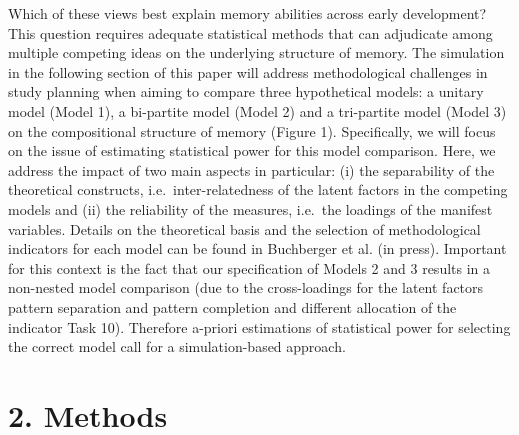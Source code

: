 \documentclass[
  man,floatsintext]{apa6}
\begin{document}
Which of these views best explain memory abilities across early development? This question requires adequate statistical methods that can adjudicate among multiple competing ideas on the underlying structure of memory. The simulation in the following section of this paper will address methodological challenges in study planning when aiming to compare three hypothetical models: a unitary model (Model 1), a bi-partite model (Model 2) and a tri-partite model (Model 3) on the compositional structure of memory (Figure 1). Specifically, we will focus on the issue of estimating statistical power for this model comparison. Here, we address the impact of two main aspects in particular: (i) the separability of the theoretical constructs, i.e.~inter-relatedness of the latent factors in the competing models and (ii) the reliability of the measures, i.e.~the loadings of the manifest variables. Details on the theoretical basis and the selection of methodological indicators for each model can be found in Buchberger et al. (in press). Important for this context is the fact that our specification of Models 2 and 3 results in a non-nested model comparison (due to the cross-loadings for the latent factors pattern separation and pattern completion and different allocation of the indicator Task 10). Therefore a-priori estimations of statistical power for selecting the correct model call for a simulation-based approach.

\hypertarget{methods}{%
\section{2. Methods}\label{methods}}
\end{document}
